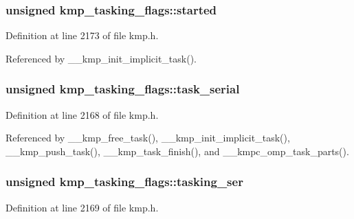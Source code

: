 \hypertarget{structkmp__tasking__flags_a9242efec8f2956663c96a10a12601c22}{
\subsubsection[{started}]{\setlength{\rightskip}{0pt plus 5cm}unsigned kmp\-\_\-tasking\-\_\-flags\-::started}}\label{structkmp__tasking__flags_a9242efec8f2956663c96a10a12601c22}


Definition at line 2173 of file kmp.\-h.



Referenced by \-\_\-\-\_\-kmp\-\_\-init\-\_\-implicit\-\_\-task().

\hypertarget{structkmp__tasking__flags_a1e4fa96ecc4d22b55ae1ddfa4f83bdfd}{
\subsubsection[{task\-\_\-serial}]{\setlength{\rightskip}{0pt plus 5cm}unsigned kmp\-\_\-tasking\-\_\-flags\-::task\-\_\-serial}}\label{structkmp__tasking__flags_a1e4fa96ecc4d22b55ae1ddfa4f83bdfd}


Definition at line 2168 of file kmp.\-h.



Referenced by \-\_\-\-\_\-kmp\-\_\-free\-\_\-task(), \-\_\-\-\_\-kmp\-\_\-init\-\_\-implicit\-\_\-task(), \-\_\-\-\_\-kmp\-\_\-push\-\_\-task(), \-\_\-\-\_\-kmp\-\_\-task\-\_\-finish(), and \-\_\-\-\_\-kmpc\-\_\-omp\-\_\-task\-\_\-parts().

\hypertarget{structkmp__tasking__flags_a68f882661553dde50d4ccc2e472e9f05}{
\subsubsection[{tasking\-\_\-ser}]{\setlength{\rightskip}{0pt plus 5cm}unsigned kmp\-\_\-tasking\-\_\-flags\-::tasking\-\_\-ser}}\label{structkmp__tasking__flags_a68f882661553dde50d4ccc2e472e9f05}


Definition at line 2169 of file kmp.\-h.



